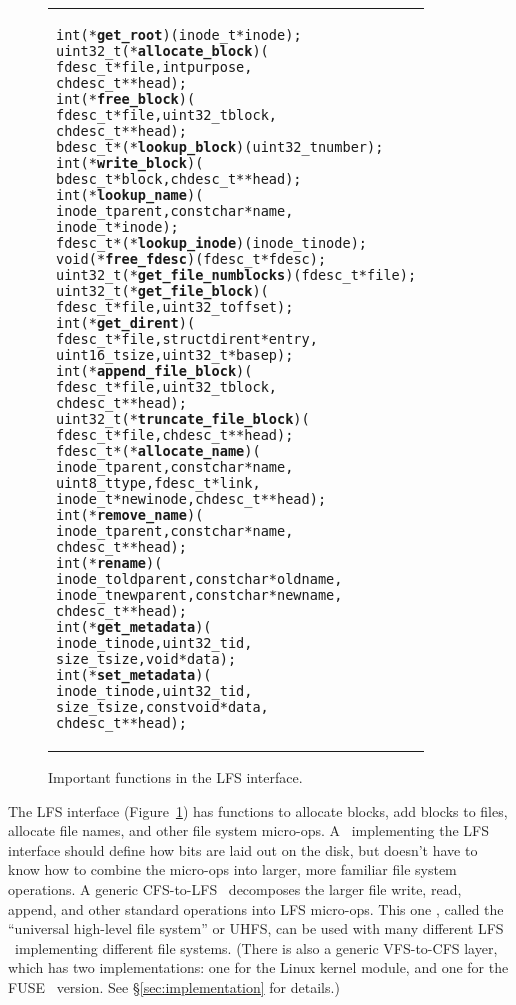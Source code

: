 \begin{figure}[thb]
\vskip-14pt
\begin{tabular}{@{\hskip0.25in}p{2in}@{}}
\begin{scriptsize}
\begin{alltt}
int (*\textbf{get_root})(inode_t *inode);
uint32_t (*\textbf{allocate_block})(
    fdesc_t *file, int purpose,
    chdesc_t **head);
int (*\textbf{free_block})(
    fdesc_t *file, uint32_t block,
    chdesc_t **head);
bdesc_t *(*\textbf{lookup_block})(uint32_t number);
int (*\textbf{write_block})(
    bdesc_t *block, chdesc_t **head);
int (*\textbf{lookup_name})(
    inode_t parent, const char *name,
    inode_t *inode);
fdesc_t *(*\textbf{lookup_inode})(inode_t inode);
void (*\textbf{free_fdesc})(fdesc_t *fdesc);
uint32_t (*\textbf{get_file_numblocks})(fdesc_t *file);
uint32_t (*\textbf{get_file_block})(
    fdesc_t *file, uint32_t offset);
int (*\textbf{get_dirent})(
    fdesc_t *file, struct dirent *entry,
    uint16_t size, uint32_t *basep);
int (*\textbf{append_file_block})(
    fdesc_t *file, uint32_t block,
    chdesc_t **head);
uint32_t (*\textbf{truncate_file_block})(
    fdesc_t *file, chdesc_t **head);
fdesc_t *(*\textbf{allocate_name})(
    inode_t parent, const char *name,
    uint8_t type, fdesc_t *link,
    inode_t *newinode, chdesc_t **head);
int (*\textbf{remove_name})(
    inode_t parent, const char *name,
    chdesc_t **head);
int (*\textbf{rename})(
    inode_t oldparent, const char *oldname,
    inode_t newparent, const char *newname,
    chdesc_t **head);
int (*\textbf{get_metadata})(
    inode_t inode, uint32_t id,
    size_t size, void *data);
int (*\textbf{set_metadata})(
    inode_t inode, uint32_t id,
    size_t size, const void *data,
    chdesc_t **head);
\end{alltt}
\end{scriptsize}
\end{tabular}
\vspace{-10pt}
\caption{\label{fig:lfs} Important functions in the LFS interface.}
\end{figure}

The LFS interface (Figure~\ref{fig:lfs}) has functions to allocate blocks, add
blocks to files, allocate file names, and other file system micro-ops. A
\module\ implementing the LFS interface should define how bits are laid out on
the disk, but doesn't have to know how to combine the micro-ops into larger,
more familiar file system operations. A generic CFS-to-LFS \module\ decomposes
the larger file write, read, append, and other standard operations into LFS
micro-ops. This one \module, called the ``universal high-level file system'' or
UHFS, can be used with many different LFS \modules\ implementing different file
systems. (There is also a generic VFS-to-CFS layer, which has two
implementations: one for the Linux kernel module, and one for the
FUSE~\cite{fuse} version. See \S\ref{sec:implementation} for details.)

